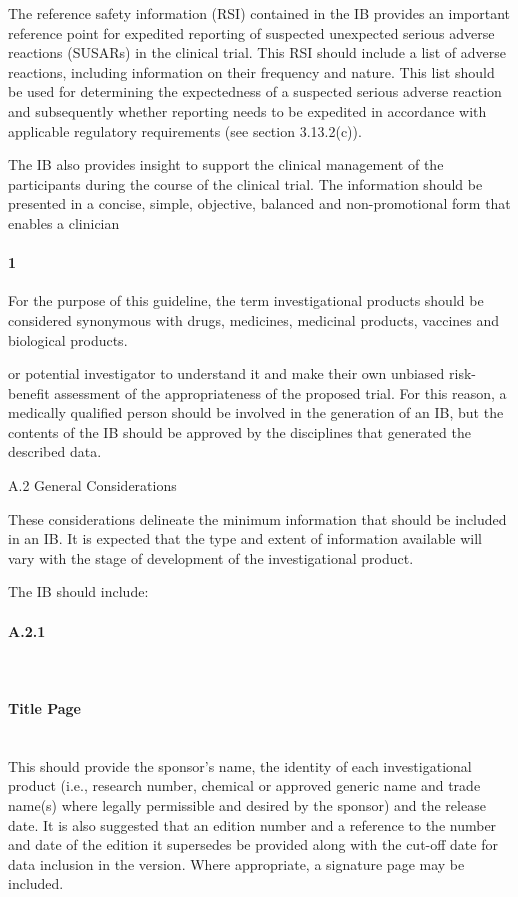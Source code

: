 \documentclass[11pt]{article}
\begin{document}
The reference safety information (RSI) contained in the IB provides an important reference point for expedited reporting of suspected unexpected serious adverse reactions (SUSARs) in the clinical trial. This RSI should include a list of adverse reactions, including information on their frequency and nature. This list should be used for determining the expectedness of a suspected serious adverse reaction and subsequently whether reporting needs to be expedited in accordance with applicable regulatory requirements (see section 3.13.2(c)).


The IB also provides insight to support the clinical management of the participants during the course of the clinical trial. The information should be presented in a concise, simple, objective, balanced and non-promotional form that enables a clinician


\paragraph{1} For the purpose of this guideline, the term investigational products should be considered synonymous with drugs, medicines, medicinal products, vaccines and biological products.

or potential investigator to understand it and make their own unbiased risk-benefit assessment of the appropriateness of the proposed trial. For this reason, a medically qualified person should be involved in the generation of an IB, but the contents of the IB should be approved by the disciplines that generated the described data.


A.2 General Considerations


These considerations delineate the minimum information that should be included in an IB. It is expected that the type and extent of information available will vary with the stage of development of the investigational product.


The IB should include:


\paragraph{A.2.1}\mbox{}\\

\paragraph{Title Page}\mbox{}\\

This should provide the sponsor's name, the identity of each investigational product (i.e., research number, chemical or approved generic name and trade name(s) where legally permissible and desired by the sponsor) and the release date. It is also suggested that an edition number and a reference to the number and date of the edition it supersedes be provided along with the cut-off date for data inclusion in the version. Where appropriate, a signature page may be included.
\end{document}
